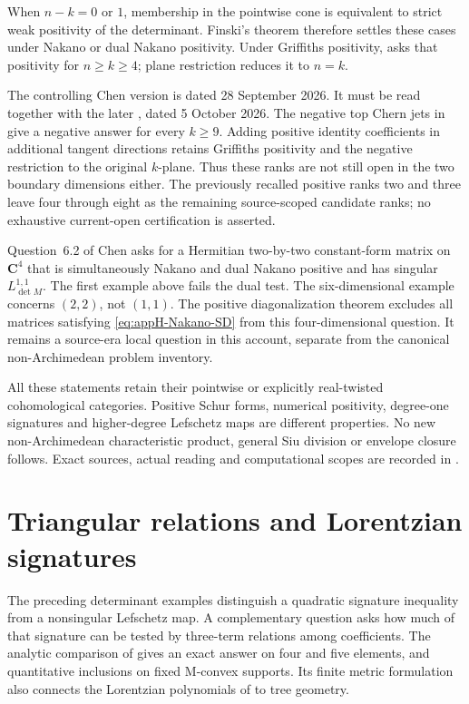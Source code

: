 When $n-k=0$ or $1$, membership in the pointwise cone is
equivalent to strict weak positivity of the determinant.
Finski's theorem therefore settles these cases under Nakano
or dual Nakano positivity. Under Griffiths positivity,
\cite[Question~6.1]{Chen26NakanoDeterminantsV2} asks that
positivity for $n\geq k\geq4$; plane restriction reduces
it to $n=k$.

The controlling Chen version is dated 28 September 2026.
It must be read together with the later
\cite[Theorem~1.1]{Du26GriffithsTopChernV1}, dated
5 October 2026. The negative top Chern jets in
 give a negative answer for
every $k\geq9$. Adding positive identity coefficients in
additional tangent directions retains Griffiths positivity
and the negative restriction to the original $k$-plane.
Thus these ranks are not still open in the two boundary
dimensions either. The previously recalled positive ranks
two and three leave four through eight as the remaining
source-scoped candidate ranks; no exhaustive current-open
certification is asserted.

Question~6.2 of Chen asks for a Hermitian two-by-two
constant-form matrix on $\mathbf C^4$ that is simultaneously
Nakano and dual Nakano positive and has singular
$L^{1,1}_{\det M}$. The first example above fails the
dual test. The six-dimensional example concerns $(2,2)$,
not $(1,1)$. The positive diagonalization theorem excludes
all matrices satisfying \eqref{eq:appH-Nakano-SD} from this
four-dimensional question. It remains a source-era local
question in this account, separate from the canonical
non-Archimedean problem inventory.

All these statements retain their pointwise or explicitly
real-twisted cohomological categories. Positive Schur forms,
numerical positivity, degree-one signatures and higher-degree
Lefschetz maps are different properties. No new
non-Archimedean characteristic product, general Siu division
or envelope closure follows. Exact sources, actual reading
and computational scopes are recorded in
.


\section{Triangular relations and Lorentzian signatures}
\label{sec:appH-triangular-Lorentzian}

The preceding determinant examples distinguish a quadratic signature
inequality from a nonsingular Lefschetz map. A complementary question
asks how much of that signature can be tested by three-term relations
among coefficients. The analytic comparison of
\cite{BakerHuhKummerLorscheid26AnalyticV2} gives an exact answer on
four and five elements, and quantitative inclusions on fixed
M-convex supports. Its finite metric formulation also connects the
Lorentzian polynomials of
 to tree geometry.

